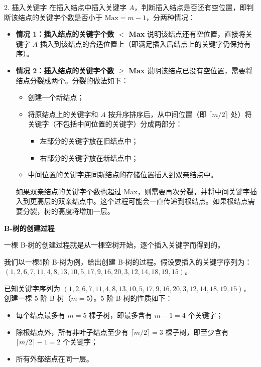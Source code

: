 \documentclass[lang=cn,newtx,10pt,scheme=chinese]{elegantbook}
\begin{document}
2. 插入关键字  
   在插入结点中插入关键字 $A$，判断插入结点是否还有空位置，即判断该结点的关键字个数是否小于 $\text{Max} = m-1$，分两种情况：
   \begin{itemize}
     \item \textbf{情况 1：插入结点的关键字个数 $<$ Max}  
       说明该结点还有空位置，直接将关键字 $A$ 插入到该结点的合适位置上（即满足插入后结点上的关键字仍保持有序）。
     \item \textbf{情况 2：插入结点的关键字个数 $\geq$ Max}  
       说明该结点已没有空位置，需要将结点分裂成两个。分裂的做法如下：
       \begin{itemize}
         \item 创建一个新结点；
         \item 将原结点上的关键字和 $A$ 按升序排序后，从中间位置（即 $\lceil m/2 \rceil$ 处）将关键字（不包括中间位置的关键字）分成两部分：
           \begin{itemize}
             \item 左部分的关键字放在旧结点中；
             \item 右部分的关键字放在新结点中；
           \end{itemize}
         \item 中间位置的关键字连同新结点的存储位置插入到双亲结点中。
       \end{itemize}
       如果双亲结点的关键字个数也超过 Max，则需要再次分裂，并将中间关键字插入到更高层的双亲结点中。这个过程可能会一直传递到根结点。如果根结点需要分裂，树的高度将增加一层。
   \end{itemize}


\textbf{B-树的创建过程}  

一棵 B-树的创建过程就是从一棵空树开始，逐个插入关键字而得到的。

我们以一棵5阶 B-树为例，给出创建 B-树的过程。假设要插入的关键字序列为：$(1, 2, 6, 7, 11, 4, 8, 13, 10, 5, 17, 9, 16, 20, 3, 12, 14, 18, 19, 15)$。

已知关键字序列为 $(1, 2, 6, 7, 11, 4, 8, 13, 10, 5, 17, 9, 16, 20, 3, 12, 14, 18, 19, 15)$，创建一棵 5 阶 B-树（$m=5$）。5 阶 B-树的性质如下：
\begin{itemize}
  \item 每个结点最多有 $m = 5$ 棵子树，即最多含有 $m-1 = 4$ 个关键字；
  \item 除根结点外，所有非叶子结点至少有 $\lceil m/2 \rceil = 3$ 棵子树，即至少含有 $\lceil m/2 \rceil - 1 = 2$ 个关键字；
  \item 所有外部结点在同一层。
\end{itemize}
\end{document}
